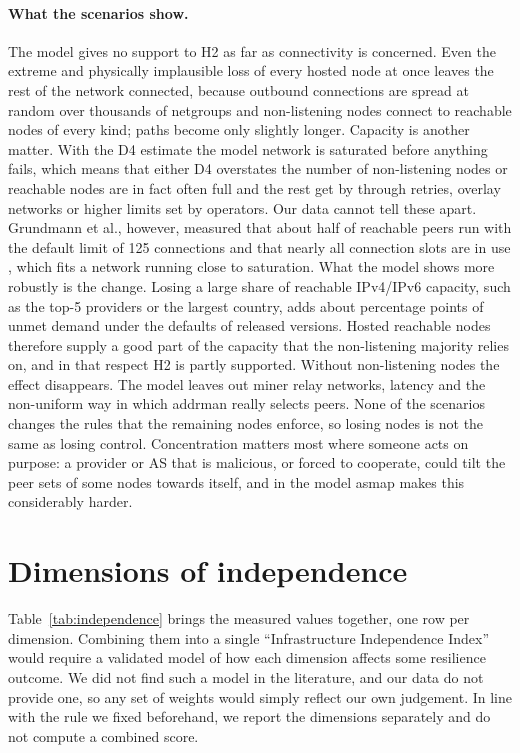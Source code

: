 \documentclass[10pt,a4paper]{article}
\begin{document}
\paragraph{What the scenarios show.} The model gives no support to H2 as far as connectivity is concerned. Even the extreme and physically implausible loss of every hosted node at once leaves the rest of the network connected, because outbound connections are spread at random over thousands of netgroups and non-listening nodes connect to reachable nodes of every kind; paths become only slightly longer. Capacity is another matter. With the D4 estimate the model network is saturated before anything fails, which means that either D4 overstates the number of non-listening nodes or reachable nodes are in fact often full and the rest get by through retries, overlay networks or higher limits set by operators. Our data cannot tell these apart. Grundmann et al., however, measured that about half of reachable peers run with the default limit of 125 connections and that nearly all connection slots are in use \cite{grundmann2022degree}, which fits a network running close to saturation. What the model shows more robustly is the change. Losing a large share of reachable IPv4/IPv6 capacity, such as the top-5 providers or the largest country, adds about \UnmetRelTopfiveDelta{} percentage points of unmet demand under the defaults of released versions. Hosted reachable nodes therefore supply a good part of the capacity that the non-listening majority relies on, and in that respect H2 is partly supported. Without non-listening nodes the effect disappears. The model leaves out miner relay networks, latency and the non-uniform way in which addrman really selects peers. None of the scenarios changes the rules that the remaining nodes enforce, so losing nodes is not the same as losing control. Concentration matters most where someone acts on purpose: a provider or AS that is malicious, or forced to cooperate, could tilt the peer sets of some nodes towards itself, and in the model asmap makes this considerably harder.

\section{Dimensions of independence}\label{sec:independence}

Table~\ref{tab:independence} brings the measured values together, one row per dimension. Combining them into a single ``Infrastructure Independence Index'' would require a validated model of how each dimension affects some resilience outcome. We did not find such a model in the literature, and our data do not provide one, so any set of weights would simply reflect our own judgement. In line with the rule we fixed beforehand, we report the dimensions separately and do not compute a combined score.
\end{document}
